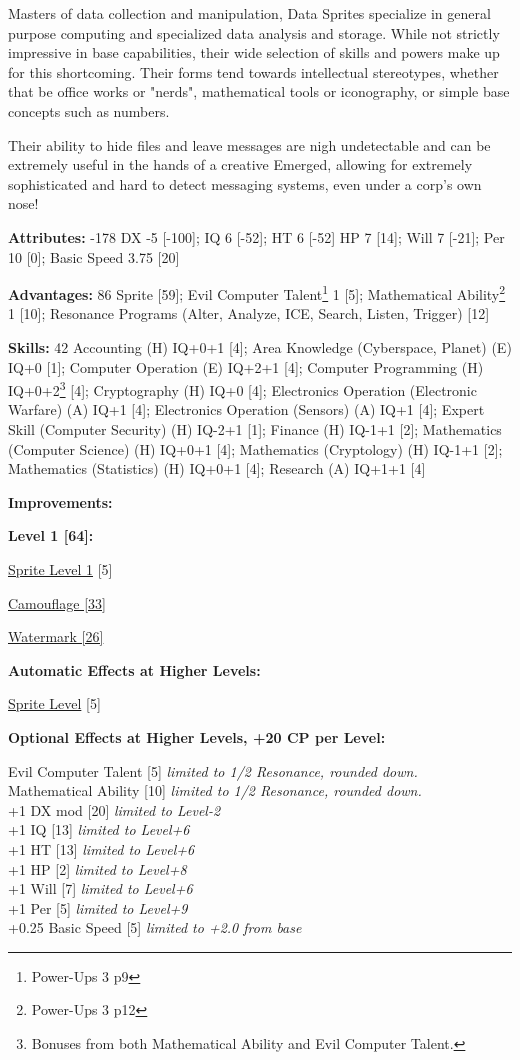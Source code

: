 \begin{multicols*}{3}
Masters of data collection and manipulation, Data Sprites specialize in general purpose computing and specialized data analysis and storage. While not strictly impressive in base capabilities, their wide selection of skills and powers make up for this shortcoming. Their forms tend towards intellectual stereotypes, whether that be office works or "nerds", mathematical tools or iconography, or simple base concepts such as numbers.

Their ability to hide files and leave messages are nigh undetectable and can be extremely useful in the hands of a creative Emerged, allowing for extremely sophisticated and hard to detect messaging systems, even under a corp's own nose!

\textbf{Attributes:} -178
DX -5 [-100]; IQ 6 [-52]; HT 6 [-52]
HP 7 [14]; Will 7 [-21]; Per 10 [0]; Basic Speed 3.75 [20]

\textbf{Advantages:} 86
Sprite [59]; Evil Computer Talent\footnote{Power-Ups 3 p9} 1 [5]; Mathematical Ability\footnote{Power-Ups 3 p12} 1 [10]; Resonance Programs (Alter, Analyze, ICE, Search, Listen, Trigger) [12]

\textbf{Skills:} 42
Accounting (H) IQ+0+1 [4]; Area Knowledge (Cyberspace, Planet) (E) IQ+0 [1]; Computer Operation (E) IQ+2+1 [4]; Computer Programming (H) IQ+0+2\footnote{Bonuses from both Mathematical Ability and Evil Computer Talent.} [4]; Cryptography (H) IQ+0 [4]; Electronics Operation (Electronic Warfare) (A) IQ+1 [4]; Electronics Operation (Sensors) (A) IQ+1 [4]; Expert Skill (Computer Security) (H) IQ-2+1 [1]; Finance (H) IQ-1+1 [2]; Mathematics (Computer Science) (H) IQ+0+1 [4]; Mathematics (Cryptology) (H) IQ-1+1 [2]; Mathematics (Statistics) (H) IQ+0+1 [4]; Research (A) IQ+1+1 [4] 

\textbf{Improvements:}

\textbf{Level 1 [64]:}

\hyperref[sprite_level]{Sprite Level 1} [5]

\hyperref[camouflage]{Camouflage [33]}

\hyperref[watermark]{Watermark [26]}

\textbf{Automatic Effects at Higher Levels:}

\hyperref[sprite_level]{Sprite Level} [5]

\textbf{Optional Effects at Higher Levels, +20 CP per Level:}

Evil Computer Talent [5] \textit{limited to 1/2 Resonance, rounded down.}\\
Mathematical Ability [10] \textit{limited to 1/2 Resonance, rounded down.}\\
+1 DX mod [20] \textit{limited to Level-2}\\
+1 IQ [13] \textit{limited to Level+6}\\
+1 HT [13] \textit{limited to Level+6}\\
+1 HP [2] \textit{limited to Level+8}\\
+1 Will [7] \textit{limited to Level+6}\\
+1 Per [5] \textit{limited to Level+9}\\
+0.25 Basic Speed [5] \textit{limited to +2.0 from base}\\


\end{multicols*}
